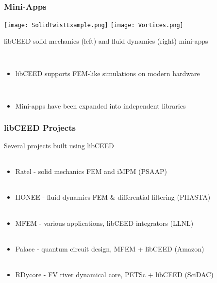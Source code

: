 \documentclass{beamer}
\begin{document}

\begin{frame}
\begin{center}
\frametitle{Mini-Apps}

\texttt{[image: SolidTwistExample.png]}
\texttt{[image: Vortices.png]}

{\small libCEED solid mechanics (left) and fluid dynamics (right) mini-apps}

~\\

\begin{itemize}

\item libCEED supports FEM-like simulations on modern hardware

~\\

\item Mini-apps have been expanded into independent libraries

\end{itemize}

\end{center}
\end{frame}


\begin{frame}
\begin{center}
\frametitle{libCEED Projects}

Several projects built using libCEED\\

~\\

\begin{itemize}

\item Ratel - solid mechanics FEM and iMPM (PSAAP)\\

~\\

\item HONEE - fluid dynamics FEM \& differential filtering (PHASTA)\\

~\\

\item MFEM - various applications, libCEED integrators (LLNL)\\

~\\

\item Palace - quantum circuit design, MFEM + libCEED (Amazon)\\

~\\

\item RDycore - FV river dynamical core, PETSc + libCEED (SciDAC)\\

\end{itemize}

\end{center}
\end{frame}
\end{document}
